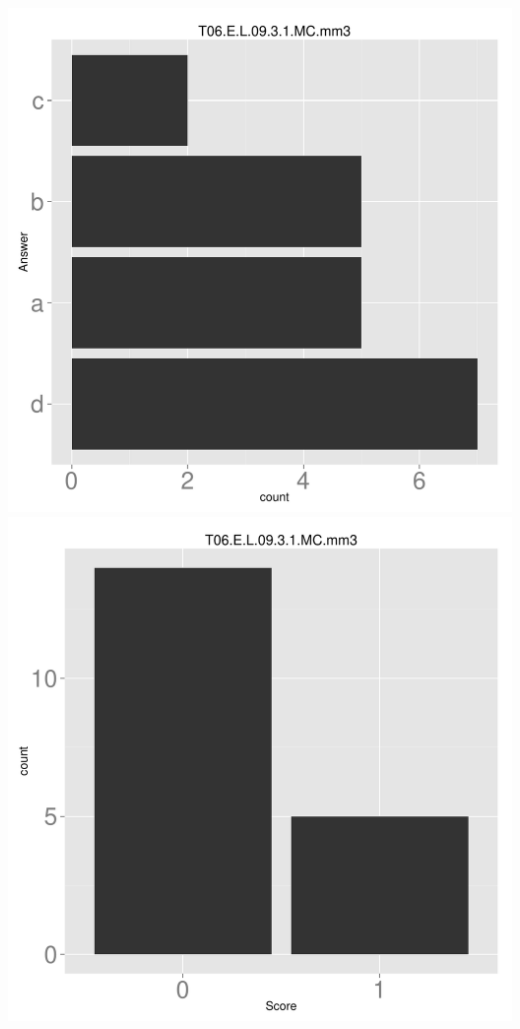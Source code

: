 \documentclass[12pt,english,nohyper]{tufte-handout}\usepackage[]{graphicx}\usepackage[]{color}
\begin{document}
\begin{center} \includegraphics[width=.45\linewidth]{Topic06_AB_41_answer} \includegraphics[width=.45\linewidth]{Topic06_AB_41_score} \end{center} 
\end{document}
